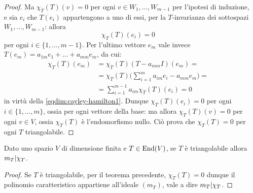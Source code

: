 \begin{proof}
	Ma $\chi_{\overline{T}}(T)(v)=0$ per ogni $v\in W_1,\dots,W_{m-1}$ per l'ipotesi di induzione, e sia $e_i$ che $T(e_i)$ appartengono a uno di essi, per la $T$-invarianza dei sottospazi $W_1,\dots,W_{m-1}$: allora
	\begin{equation}
		\chi_T(T)(e_i)=0 \tag{a}
		\label{eqdim:cayley-hamilton1}
	\end{equation}
	per ogni $i\in\{1,\dots,m-1\}$.
	Per l'ultimo vettore $e_m$ vale invece $T(e_m)=a_{1m}e_1+\dots+a_{mm}e_m$, da cui:
	\begin{equation*}
		\begin{split}
			\chi_T(T)(e_m)&=\chi_{\overline{T}}(T)(T-a_{mm}I)(e_m)=\\
			&=\chi_{\overline{T}}(T)\Big(\sum_{i=1}^ma_{im}e_i-a_{mm}e_m\Big)=\\
			&=\sum_{i=1}^{m-1}a_{im}\chi_{\overline{T}}(T)(e_i)=0
		\end{split}
	\end{equation*}
	in virtù della \eqref{eqdim:cayley-hamilton1}.
	Dunque $\chi_T(T)(e_i)=0$ per ogni $i\in\{1,\dots,m\}$, ossia per ogni vettore della base: ma allora $\chi_T(T)(v)=0$ per ogni $v\in V$, ossia $\chi_T(T)$ è l'endomorfismo nullo.
	Ciò prova che $\chi_T(T)=0$ per ogni $T$ triangolabile.
\end{proof}

\begin{corollario}
	Dato uno spazio $V$ di dimensione finita e $T\in\operatorname{End}(V)$, se $T$ è triangolabile allora $m_T|\chi_T$.
\end{corollario}
\begin{proof}
	Se $T$ è triangolabile, per il teorema precedente, $\chi_T(T)=0$ dunque il polinomio caratteristico appartiene all'ideale $(m_T)$, vale a dire $m_T| \chi_T$.
\end{proof}
